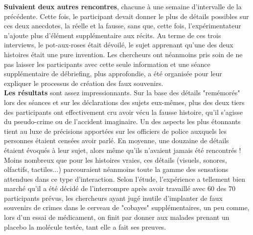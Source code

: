 \documentclass[11pt,twoside,a4paper]{article}
\begin{document}
\textbf{Suivaient deux autres rencontres}, chacune {\`a} une semaine d'intervalle de la pr{\'e}c{\'e}dente. Cette fois, le participant devait donner le plus de d{\'e}tails possibles sur ces deux anecdotes, la r{\'e}elle et la fausse, sans que, cette fois, l'exp{\'e}rimentateur n'ajoute plus d'{\'e}l{\'e}ment suppl{\'e}mentaire aux r{\'e}cits. Au terme de ces trois interviews, le pot-aux-roses {\'e}tait d{\'e}voil{\'e}, le sujet apprenant qu'une des deux histoires {\'e}tait une pure invention. Les chercheurs ont n{\'e}anmoins pris soin de ne pas laisser les participants avec cette seule information et une s{\'e}ance suppl{\'e}mentaire de d{\'e}briefing, plus approfondie, a {\'e}t{\'e} organis{\'e}e pour leur expliquer le processus de cr{\'e}ation des faux souvenirs.~\\

\textbf{Les r{\'e}sultats} sont assez impressionnants. Sur la base des d{\'e}tails "rem{\'e}mor{\'e}s" lors des s{\'e}ances et sur les d{\'e}clarations des sujets eux-m{\^e}mes, plus des deux tiers des participants ont effectivement cru avoir v{\'e}cu la fausse histoire, qu'il s'agisse du pseudo-crime ou de l'accident imaginaire. Un des aspects les plus {\'e}tonnants tient au luxe de pr{\'e}cisions apport{\'e}es sur les officiers de police auxquels les personnes {\'e}taient cens{\'e}es avoir parl{\'e}. En moyenne, une douzaine de d{\'e}tails {\'e}taient {\'e}voqu{\'e}s {\`a} leur sujet, alors m{\^e}me qu'ils n'avaient jamais {\'e}t{\'e} rencontr{\'e}s ! Moins nombreux que pour les histoires vraies, ces d{\'e}tails (visuels, sonores, olfactifs, tactiles...) parcouraient n{\'e}anmoins toute la gamme des sensations attendues dans ce type d'interaction. Selon l'{\'e}tude, l'exp{\'e}rience a tellement bien march{\'e} qu'il a {\'e}t{\'e} d{\'e}cid{\'e} de l'interrompre apr{\`e}s avoir travaill{\'e} avec 60 des 70 participants pr{\'e}vus, les chercheurs ayant jug{\'e} inutile d'implanter de faux souvenirs de crimes dans le cerveau de "cobayes" suppl{\'e}mentaires, un peu comme, lors d'un essai de m{\'e}dicament, on finit par donner aux malades prenant un placebo la mol{\'e}cule test{\'e}e, tant elle a fait ses preuves.~\\
\end{document}
